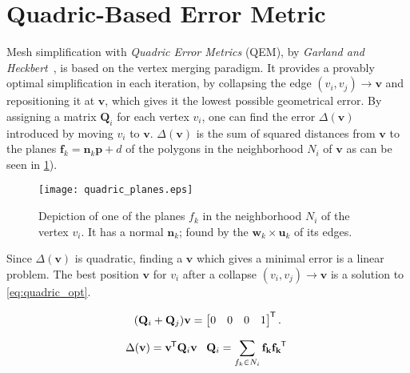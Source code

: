 \section{Quadric-Based Error Metric} \label{sec:quadric-based_error_metric}

Mesh simplification with \emph{Quadric Error Metrics} (QEM), by \emph{Garland and Heckbert}~\cite{garland1997surface}, is based on the vertex merging paradigm. It provides a provably optimal simplification in each iteration, by collapsing the edge \((v_i, v_j) \rightarrow \mathbf{v}\) and repositioning it at \(\mathbf{v}\), which gives it the lowest possible geometrical error. By assigning a matrix \(\mathbf{Q}_i\) for each vertex \(v_i\), one can find the error \(\Delta(\mathbf{v})\) introduced by moving \(v_i\) to \(\mathbf{v}\). \(\Delta(\mathbf{v})\) is the sum of squared distances from \(\mathbf{v}\) to the planes \(\mathbf{f}_k = \mathbf{n}_k\mathbf{p} + d\) of the polygons in the neighborhood \(N_i\) of \(\mathbf{v}\) as can be seen in \cref{fig:quadrics}).

\begin{figure}[ht]
  \centering
  \texttt{[image: quadric\_planes.eps]}
  \caption[Planes of neighboring faces]{Depiction of one of the planes \(f_k\) in the neighborhood \(N_i\) of the vertex \(v_i\). It has a normal \(\mathbf{n}_k\); found by the \(\mathbf{w}_k \times \mathbf{u}_k\) of its edges.}
  \label{fig:quadrics}
\end{figure}


Since \(\Delta(\mathbf{v})\) is quadratic, finding a \(\mathbf{v}\) which gives a minimal error is a linear problem. The best position \(\mathbf{v}\) for \(v_i\) after a collapse \((v_i, v_j) \rightarrow \mathbf{v}\) is a solution to \cref{eq:quadric_opt}.

\begin{equation} \label{eq:quadric_opt}
(\mathbf{Q}_i + \mathbf{Q}_j)\mathbf{v} = \begin{bmatrix} 0 & 0 & 0 & 1 \end{bmatrix}^{\mkern-1.5mu\mathsf{T}}.
\end{equation}

\begin{equation} \label{eq:homogeneous_quadric}
      \Delta(\mathbf{v}) = \mathbf{v}^{\mkern-1.5mu\mathsf{T}} \mathbf{Q}_i  \mathbf{v} \;\;\; \mathbf{Q}_i = \sum_{f_k \in N_i}  \mathbf{f_k} \mathbf{f_k}^{\mkern-1.5mu\mathsf{T}} \;
\end{equation}


